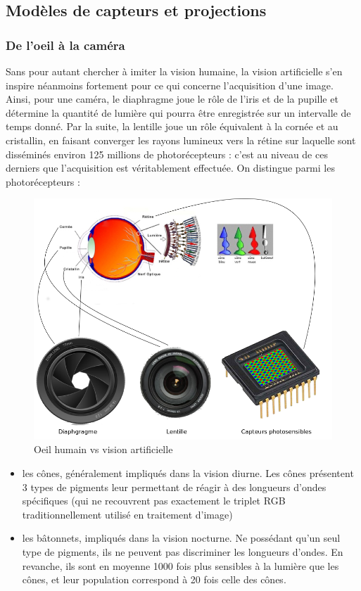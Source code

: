  \subsection{Modèles de capteurs et projections}
 
 \subsubsection{De l'oeil à la caméra}
 
 Sans pour autant chercher à imiter la vision humaine, la vision artificielle s'en inspire néanmoins fortement pour ce qui concerne l'acquisition d'une image. Ainsi, pour une caméra, le diaphragme joue le rôle de l'iris et de la pupille et détermine la quantité de lumière qui pourra être enregistrée sur un intervalle de temps donné. Par la suite, la lentille joue un rôle équivalent à la cornée et au cristallin, en faisant converger les rayons lumineux vers la rétine sur laquelle sont disséminés environ 125 millions de photorécepteurs : c'est au niveau de ces derniers que l'acquisition est véritablement effectuée. On distingue parmi les photorécepteurs :
 \begin{figure}[htp]
  \centering
  \includegraphics[width=.85\linewidth]{./intro/figures/oeil.png}
    \caption{\footnotesize{Oeil humain vs vision artificielle}}
\label{intro:fig11}
\end{figure}

 \begin{itemize}
  \item les cônes, généralement impliqués dans la vision diurne. Les cônes présentent 3 types de pigments leur permettant de réagir à des longueurs d'ondes spécifiques (qui ne recouvrent pas exactement le triplet RGB traditionnellement utilisé en traitement d'image)
  \item les bâtonnets, impliqués dans la vision nocturne. Ne possédant qu'un seul type de pigments, ils ne peuvent pas discriminer les longueurs d'ondes. En revanche, ils sont en moyenne 1000 fois plus sensibles à la lumière que les cônes, et leur population correspond à 20 fois celle des cônes.
 \end{itemize}

